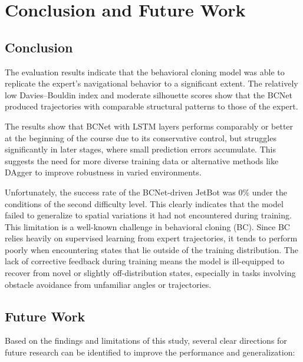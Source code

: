 \chapter{Conclusion and Future Work}
\label{cha:Conclusion}

\section{Conclusion}

The evaluation results indicate that the behavioral cloning model was able to replicate the expert’s navigational behavior to a significant extent. The relatively low Davies–Bouldin index and moderate silhouette scores show that the BCNet produced trajectories with comparable structural patterns to those of the expert.

The results show that BCNet with LSTM layers performs comparably or better at the beginning of the course due to its conservative control, but struggles significantly in later stages, where small prediction errors accumulate. This suggests the need for more diverse training data or alternative methods like DAgger to improve robustness in varied environments.

Unfortunately, the success rate of the BCNet-driven JetBot was 0\% under the conditions of the second difficulty level. This clearly indicates that the model failed to generalize to spatial variations it had not encountered during training. This limitation is a well-known challenge in behavioral cloning (BC). Since BC relies heavily on supervised learning from expert trajectories, it tends to perform poorly when encountering states that lie outside of the training distribution. The lack of corrective feedback during training means the model is ill-equipped to recover from novel or slightly off-distribution states, especially in tasks involving obstacle avoidance from unfamiliar angles or trajectories.

\section{Future Work}

Based on the findings and limitations of this study, several clear directions for future research can be identified to improve the performance and generalization:

